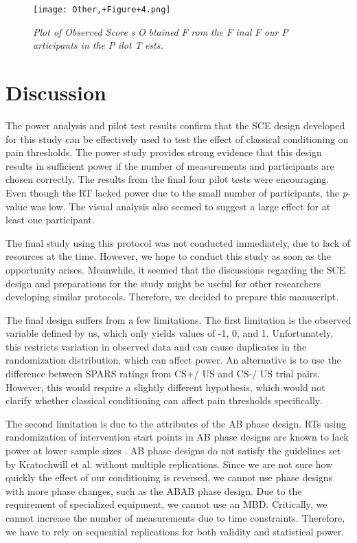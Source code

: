 \documentclass{article}
\begin{document}
\begin{figure}

  \texttt{[image: Other,+Figure+4.png]}
\caption{\emph{Plot of }\emph{Observed Score} \emph{s }\emph{O} \emph{btained }\emph{F} \emph{rom} \emph{the }\emph{F} \emph{inal }\emph{F} \emph{our }\emph{P} \emph{articipants in the }\emph{P} \emph{ilot }\emph{T} \emph{ests.} }
\label{Figure 4}
 

\end{figure}
\section{Discussion} 

The power analysis and pilot test results confirm that the SCE design developed for this study can be effectively used to test the effect of classical conditioning on pain thresholds. The power study provides strong evidence that this design results in sufficient power if the number of measurements and participants are chosen correctly. The results from the final four pilot tests were encouraging. Even though the RT lacked power due to the small number of participants, the \emph{p}-value was low. The visual analysis also seemed to suggest a large effect for at least one participant. 

The final study using this protocol was not conducted immediately, due to lack of resources at the time. However, we hope to conduct this study as soon as the opportunity arises. Meanwhile, it seemed that the discussions regarding the SCE design and preparations for the study might be useful for other researchers developing similar protocols. Therefore, we decided to prepare this manuscript.

The final design suffers from a few limitations. The first limitation is the observed variable defined by us, which only yields values of -1, 0, and 1. Unfortunately, this restricts variation in observed data and can cause duplicates in the randomization distribution, which can affect power. An alternative is to use the difference between SPARS ratings from CS+/ US and CS-/ US trial pairs. However, this would require a slightly different hypothesis, which would not clarify whether classical conditioning can affect pain thresholds specifically.

The second limitation is due to the attributes of the AB phase design. RTs using randomization of intervention start points in AB phase designs are known to lack power at lower sample sizes \autocite{bib46}. AB phase designs do not satisfy the guidelines set by Kratochwill et al. \autocite{bib26} without multiple replications. Since we are not sure how quickly the effect of our conditioning is reversed, we cannot use phase designs with more phase changes, such as the ABAB phase design. Due to the requirement of specialized equipment, we cannot use an MBD. Critically, we cannot increase the number of measurements due to time constraints. Therefore, we have to rely on sequential replications for both validity and statistical power. 
\end{document}
